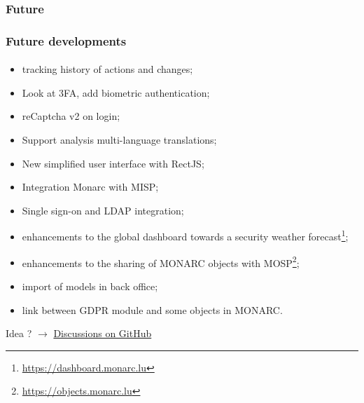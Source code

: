 \subsubsection{Future}
\begin{frame}
  \frametitle{Future developments}
  \framesubtitle{}
  \begin{itemize}
    \item tracking history of actions and changes;
    \item Look at 3FA, add biometric authentication;
    \item reCaptcha v2 on login;
    \item Support analysis multi-language translations;
    \item New simplified user interface with RectJS;
    \item Integration Monarc with MISP;
    \item Single sign-on and LDAP integration;
    \item enhancements to the global dashboard towards a
    security weather forecast\footnote{\url{https://dashboard.monarc.lu}};
    \item enhancements to the sharing of MONARC objects with
    MOSP\footnote{\url{https://objects.monarc.lu}};
    \item import of models in back office;
    \item link between GDPR module and some objects in MONARC.
  \end{itemize}
  \bigskip
  Idea ?
  $\rightarrow$
  \href{https://github.com/monarc-project/MonarcAppFO/discussions/categories/ideas}{Discussions on GitHub}
\end{frame}
